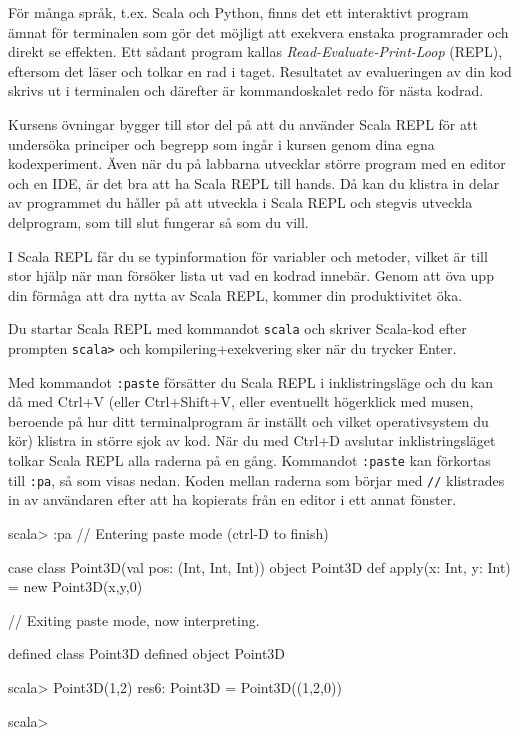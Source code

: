 För många språk, t.ex. Scala och Python, finns det ett interaktivt program ämnat för terminalen som gör det möjligt att exekvera enstaka programrader och direkt se effekten. Ett sådant program kallas \textit{Read-Evaluate-Print-Loop} (REPL), eftersom det läser  och tolkar en rad i taget. Resultatet av evalueringen av din kod skrivs ut i terminalen och därefter är kommandoskalet redo för nästa kodrad.

Kursens övningar bygger till stor del på att du använder Scala REPL för att undersöka principer och begrepp som ingår i kursen genom dina egna kodexperiment. Även när du på labbarna utvecklar större program med en editor och en IDE, är det bra att ha Scala REPL till hands. Då kan du klistra in delar av programmet du håller på att utveckla i Scala REPL och stegvis utveckla delprogram, som till slut fungerar så som du vill. 

I Scala REPL får du se typinformation för variabler och metoder, vilket är till stor hjälp när man försöker lista ut vad en kodrad innebär. Genom att öva upp din förmåga att dra nytta av Scala REPL, kommer din produktivitet öka.

Du startar Scala REPL med kommandot \texttt{scala} och skriver Scala-kod efter prompten \texttt{scala>} och kompilering+exekvering sker när du trycker Enter.

Med kommandot \texttt{:paste} försätter du Scala REPL i inklistringsläge  och du kan då med Ctrl+V (eller Ctrl+Shift+V, eller eventuellt högerklick med musen, beroende på hur ditt terminalprogram är inställt och vilket operativsystem du kör) klistra in större sjok av kod. När du med Ctrl+D avslutar inklistringsläget tolkar Scala REPL alla raderna på en gång. Kommandot  \texttt{:paste} kan förkortas till  \texttt{:pa}, så som visas nedan. Koden mellan raderna som börjar med \texttt{//} klistrades in av användaren efter att ha kopierats från en editor i ett annat fönster.

\begin{REPLnonum}
scala> :pa
// Entering paste mode (ctrl-D to finish)

case class Point3D(val pos: (Int, Int, Int))
object Point3D {
  def apply(x: Int, y: Int) = new Point3D(x,y,0)
}

// Exiting paste mode, now interpreting.

defined class Point3D
defined object Point3D

scala> Point3D(1,2)
res6: Point3D = Point3D((1,2,0))

scala> 
\end{REPLnonum}

